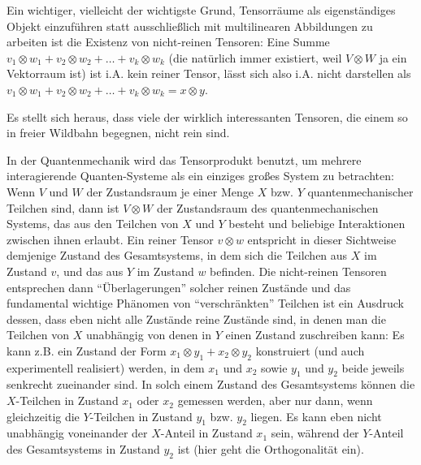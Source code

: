 \begin{remark}
Ein wichtiger, vielleicht der wichtigste Grund, Tensorräume als eigenständiges Objekt einzuführen statt ausschließlich mit multilinearen Abbildungen zu arbeiten ist die Existenz von nicht-reinen Tensoren: Eine Summe $v_1\otimes w_1 + v_2\otimes w_2 + \ldots + v_k\otimes w_k$ (die natürlich immer existiert, weil $V\otimes W$ ja ein Vektorraum ist) ist i.A. kein reiner Tensor, lässt sich also i.A. nicht darstellen als $v_1\otimes w_1 + v_2\otimes w_2 + \ldots + v_k\otimes w_k = x\otimes y$.

\medbreak
Es stellt sich heraus, dass viele der wirklich interessanten Tensoren, die einem so in freier Wildbahn begegnen, nicht rein sind.
\end{remark}
\begin{example}
In der Quantenmechanik wird das Tensorprodukt benutzt, um mehrere interagierende Quanten-Systeme als ein einziges großes System zu betrachten: Wenn $V$ und $W$ der Zustandsraum je einer Menge $X$ bzw. $Y$ quantenmechanischer Teilchen sind, dann ist $V\otimes W$ der Zustandsraum des quantenmechanischen Systems, das aus den Teilchen von $X$ und $Y$ besteht und beliebige Interaktionen zwischen ihnen erlaubt. Ein reiner Tensor $v\otimes w$ entspricht in dieser Sichtweise demjenige Zustand des Gesamtsystems, in dem sich die Teilchen aus $X$ im Zustand $v$, und das aus $Y$ im Zustand $w$ befinden. Die nicht-reinen Tensoren entsprechen dann \enquote{Überlagerungen} solcher reinen Zustände und das fundamental wichtige Phänomen von \enquote{verschränkten} Teilchen ist ein Ausdruck dessen, dass eben nicht alle Zustände reine Zustände sind, in denen man die Teilchen von $X$ unabhängig von denen in $Y$ einen Zustand zuschreiben kann: Es kann z.B. ein Zustand der Form $x_1\otimes y_1 + x_2\otimes y_2$ konstruiert (und auch experimentell realisiert) werden, in dem $x_1$ und $x_2$ sowie $y_1$ und $y_2$ beide jeweils senkrecht zueinander sind. In solch einem Zustand des Gesamtsystems können die $X$-Teilchen in Zustand $x_1$ oder $x_2$ gemessen werden, aber nur dann, wenn gleichzeitig die $Y$-Teilchen in Zustand $y_1$ bzw. $y_2$ liegen. Es kann eben nicht unabhängig voneinander der $X$-Anteil in Zustand $x_1$ sein, während der $Y$-Anteil des Gesamtsystems in Zustand $y_2$ ist (hier geht die Orthogonalität ein).
\end{example}

